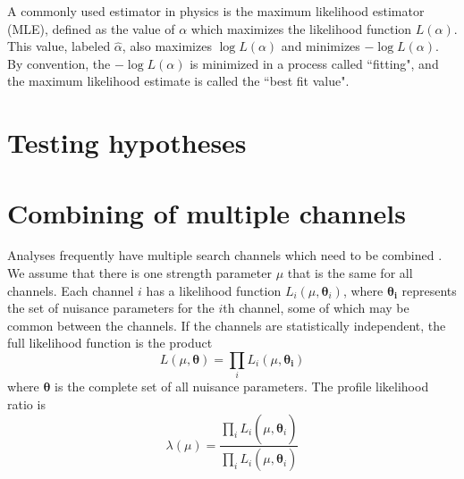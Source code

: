 A commonly used estimator in physics is the maximum likelihood estimator (MLE), defined as the value of $\alpha$ which maximizes the likelihood function $L(\alpha)$. This value, labeled $\hat{\alpha}$, also maximizes $\log L(\alpha)$ and minimizes $ - \log L(\alpha)$. By convention, the $-\log L(\alpha)$ is minimized in a process called ``fitting", and the maximum likelihood estimate is called the ``best fit value". 








\section{Testing hypotheses}


\section{Combining of multiple channels}
Analyses frequently have multiple search channels which need to be combined \cite{2011-Cowan-et-al}. We assume that there is one strength parameter $\mu$ that is the same for all channels. Each channel $i$ has a likelihood function $L_{i} (\mu, \boldsymbol{\theta}_i)$, where $\boldsymbol{\theta_i}$ represents the set of nuisance parameters for the $i$th channel, some of which may be common between the channels. If the channels are statistically independent, the full likelihood function is the product
\begin{equation}
    L(\mu, \boldsymbol{\theta}) = \prod_{i} L_i (\mu, \boldsymbol{\theta_i})
\end{equation}
where $\boldsymbol{\theta}$ is the complete set of all nuisance parameters. The profile likelihood ratio is 
\begin{equation}
    \lambda(\mu) = \frac{ \prod_i L_i(\mu, \hat{\hat{\boldsymbol{\theta}}}_i) }{ \prod_i L_i(\mu, \hat{\boldsymbol{\theta}}_i)}
\end{equation}

